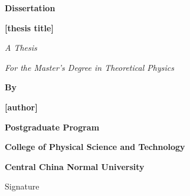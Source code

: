 \mbox{}\vspace{0.8cm}
\begin{center}
{ \bfseries {Dissertation}}
\end{center}
\vspace{0.2cm}
\begin{center}
 \textbf{[thesis title]}
\end{center}

\vspace{0.5cm}
\begin{center}
{\textit{A Thesis}\hspace*{0.7cm}\vspace{0.3cm}

\hspace*{0.7cm}\vspace{0.2cm}

\textit{For the Master's Degree in Theoretical Physics}\hspace*{0.7cm}\vspace{0.2cm}
}
\end{center}

\vspace{0.5cm}
\begin{center}
{\textbf{By}\hspace*{0.7cm}}
\end{center}
\begin{center}
{\textbf{[author]}\hspace*{0.7cm}}
\end{center}
\begin{center}
{\textbf{Postgraduate Program}\hspace*{0.7cm}}
\end{center}
\begin{center}
{\textbf{College of Physical Science and Technology}\hspace*{0.7cm}}
\end{center}
\begin{center}
{\textbf{Central China Normal University}\hspace*{0.7cm}}
\end{center}
\vspace{1.0cm}
{\hspace*{0.7cm}}
\begin{flushleft}
{\hspace{5.0cm}
Signature\underline{\hspace*{1.0cm}\hspace*{1.0cm}}}
\end{flushleft}

{\hspace{12.0cm}{Approved}}

{\hspace*{2.0cm}}

\clearpage
